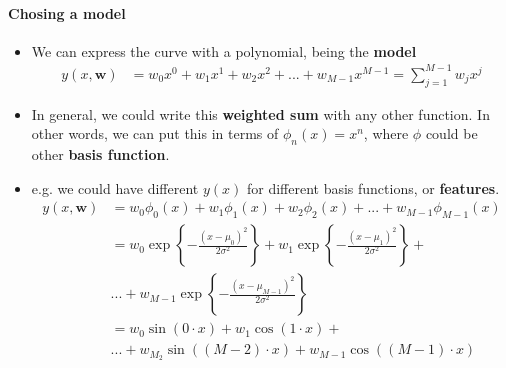 \begin{frame}{\insertsubsection}
	\framesubtitle{Chosing a model}
	\begin{itemize}
		\item We can express the curve with a polynomial, being the \textcolor{UniOrange}{\textbf{model}}
		\begin{align*}
			y(x,\mathbf{w}) &= w_0x^0 + w_1x^1 + w_2x^2  + ... + w_{M-1}x^{M-1}  = \sum^{M-1}_{j=1} w_j x^j
		\end{align*}	
		\item In general, we could write this \textcolor{UniOrange}{\textbf{weighted sum}} with any other function. In other words, we can put this in terms of $\phi_n(x)=x^n$, where $\phi$ could be other \textcolor{UniOrange}{\textbf{basis function}}.
		\item e.g. we could have different $y(x)$ for different basis functions, or \textcolor{UniOrange}{\textbf{features}}.
		\begin{align*}
			y(x,\mathbf{w}) &= w_0 \phi_0(x) +w_1 \phi_1(x) +w_2 \phi_2(x)  + ... + w_{M-1} \phi_{M-1}(x) \\
							&= w_0 \exp\left\{ - \frac{(x-\mu_0)^2}{2\sigma^2}\right\} + w_1  \exp\left\{ - \frac{(x-\mu_1)^2}{2\sigma^2}\right\} + \\ & ... + w_{M-1} \exp\left\{ - \frac{(x-\mu_{M-1})^2}{2\sigma^2}\right\} \\
							&= w_0 \sin(0 \cdot x) + w_1 \cos(1 \cdot x) + \\ &... + w_{M_2} \sin((M-2) \cdot x) + w_{M-1} \cos((M-1) \cdot x)
		\end{align*}

\end{itemize}
\end{frame}

